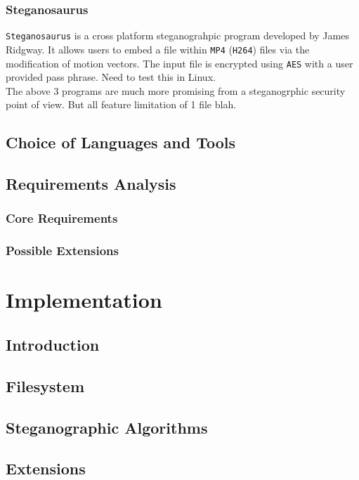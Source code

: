 \documentclass[paper=a4, fontsize=11pt,twoside]{scrartcl}    %
\begin{document}
\subsubsection{Steganosaurus}

\texttt{Steganosaurus} is a cross platform steganograhpic program developed by James Ridgway. It allows users to embed a file within \texttt{MP4} (\texttt{H264}) files via the modification of motion vectors. The input file is encrypted using \texttt{AES} with a user provided pass phrase. Need to test this in Linux.\\

\noindent
The above 3 programs are much more promising from a steganogrphic security point of view. But all feature limitation of 1 file blah.




\vfill


\subsection{Choice of Languages and Tools}

\subsection{Requirements Analysis}

\subsubsection{Core Requirements}
\subsubsection{Possible Extensions}

\section{Implementation}
\subsection{Introduction}
\subsection{Filesystem}
\subsection{Steganographic Algorithms}
\subsection{Extensions}
\end{document}
